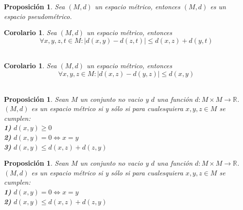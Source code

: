 \documentclass[oneside]{book} %
\theoremstyle{Teorema}
\newtheorem{Corolario}[Definicion]{Corolario}
\newtheorem{Proposicion}[Definicion]{Proposición}
\theoremstyle{Ejemplos}
\theoremstyle{[Obs]}
\newcommand{\abs}[1]{\left|#1\right|} %
\renewcommand{\{}{\left\lbrace} %
\renewcommand{\}}{\right\rbrace} %
\newcommand{\R}{\mathbb{R}} %
\begin{document}
			\begin{Proposicion}
				
				Sea $(M, d)$ un espacio métrico, entonces $(M, d)$ es un espacio pseudométrico.

			\end{Proposicion}

			\begin{Corolario}

				Sea $(M, d)$ un espacio métrico, entonces \\

				\[ \forall x, y, z, t \in M : \abs{d(x, y) - d(z, t)} \leq d(x, z) + d(y, t) \] \\

			\end{Corolario}

			\begin{Corolario}

				Sea $(M, d)$ un espacio métrico, entonces \\

				\[ \forall x, y, z \in M : \abs{d(x, z) - d(y, z)} \leq d(x, y) \] \\

			\end{Corolario}

			\begin{Proposicion}

				Sean $M$ un conjunto no vacio y $d$ una función $d : M \times M \to \R$. $(M, d)$ es un espacio métrico si y sólo si para cualesquiera $x, y, z \in M$ se cumplen: \\

				\textbf{1)} $d(x, y) \geq 0$ \\

				\textbf{2)} $d(x, y) = 0 \Leftrightarrow x = y$ \\

				\textbf{3)} $d(x, y) \leq d(x, z) + d(z, y)$ \\

			\end{Proposicion}

			\begin{Proposicion}

				Sean $M$ un conjunto no vacio y $d$ una función $d : M \times M \to \R$. $(M, d)$ es un espacio métrico si y sólo si para cualesquiera $x, y, z \in M$ se cumplen: \\

				\textbf{1)} $d(x, y) = 0 \Leftrightarrow x = y$ \\

				\textbf{2)} $d(x, y) \leq d(x, z) + d(z, y)$ \\

			\end{Proposicion}
\end{document}
